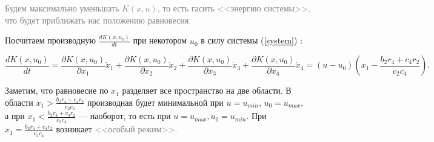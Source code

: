 \documentclass[11pt]{article}
\newcommand\Set[2]{\left\{ #1 \mid #2 \right\}}
\newcommand\Ref[1]{(\ref{#1})}
\newcommand\RS{\Ref{system} }
\newcommand\beq{\begin{equation}}
\newcommand\eeq{\end{equation}}
\newcommand\dd[2]{\frac{\partial#1}{\partial#2}}
\begin{document}
%
%

\textcolor{gray}{Будем максимально уменьшать $K(x,u)$, то есть гасить <<энергию системы>>, что будет приближать нас  положению равновесия.\\}

Посчитаем производную $\frac{dK(x,u_0)}{dt}$ при некотором $u_0$ в силу системы \RS:

$$\frac{dK(x,u_0)}{dt} = \dd{K(x,u_0)}{x_1}\dot x_1 + \dd{K(x,u_0)}{x_2}\dot x_2 + \dd{K(x,u_0)}{x_3}\dot x_3 + \dd{K(x,u_0)}{x_4}\dot x_4 = (u - u_0)\left(x_1 - \frac{b_2r_4 + c_4r_2}{c_2c_4}\right).$$

Заметим, что равновесие по $x_1$ разделяет все пространство на две области. В области $x_1 > \frac{b_2r_4 + c_4r_2}{c_2c_4}$ производная будет минимальной при $u = u_{min}, \, u_0 = u_{max},$ а при $x_1 < \frac{b_2r_4 + c_4r_2}{c_2c_4}$ --- наоборот, то есть при $u = u_{max}, u_0 = u_{min}.$ При $x_1 = \frac{b_2r_4 + c_4r_2}{c_2c_4}$ возникает \textcolor{gray}{<<особый режим>>.}
\end{document}
